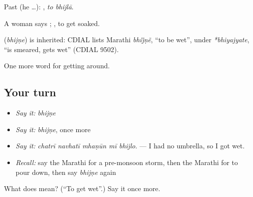 Past (he …):  , \emph{to bhijlā}.

A woman says  ;  , to get soaked.

\begin{cousinweb}
\textbf{} (\emph{bhijṇe}) is inherited: CDIAL lists Marathi \emph{bhij̈ṇẽ}, \textquotedblleft{}to be wet\textquotedblright{}, under \emph{*bhiyajyate}, \textquotedblleft{}is smeared, gets wet\textquotedblright{} (CDIAL 9502).
\end{cousinweb}

\begin{grammarlens}[title={What you've built}]
One more word for getting around.
\end{grammarlens}

\subsection*{Your turn}
\begin{itemize}
\raggedright
  \item \emph{Say it:} \emph{bhijṇe}
  \item \emph{Say it:} \emph{bhijṇe}, once more
  \item \emph{Say it:} \emph{chatrī navhatī mhaṇūn mī bhijlo.} — I had no umbrella, so I got wet.
  \item \emph{Recall:} say the Marathi for a pre-monsoon storm, then the Marathi for to pour down, then say \emph{bhijṇe} again
\end{itemize}

\begin{tcolorbox}[breakable,colback=teal!4,colframe=teal!35!black,title={Before you move on}]
What does  mean? (\textquotedblleft{}To get wet\textquotedblright{}.) Say it once more.
\end{tcolorbox}
